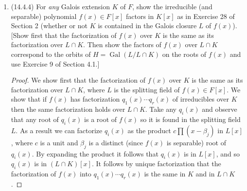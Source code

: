 \documentclass[11pt]{article}
\DeclareMathOperator{\Gal}{Gal}
\begin{document}
\begin{enumerate}
\begin{proof}
        Then apply Exercise 9 of Section 4.1 to see that $G$ permutes the orbits of $H$ transitively and each orbit has the same cardinality. In particular with $\alpha\in \mathcal{O}_1$ we have $\abs{\mathcal{O}_1} = \abs{H\colon H\cap G_\alpha}$, where $G_\alpha\leq G$ is the stabilizer of $\alpha$ in $G$, and $r = \abs{G\colon HG_a}$.

        Observe that the fixed field of $G_\alpha$ is $F(\alpha)$: every element of $F(\alpha)$ is fixed by $G_\alpha$ since $\alpha$ is fixed by $G_\alpha$, and since $L$ is the field $F$ adjoined with every root of $f(x)$, any element of $L$ fixed by $G_\alpha$ is a rational function of only $\alpha$ over $F$. Use the Galois correspondence to see that $\abs{\mathcal{O}_1} = \abs{H\colon H\cap G_\alpha} = [KF(\alpha)\colon K] = [K(\alpha)\colon K]$ ($F\subseteq K$) and the number of orbits $r$ is equal to $\abs{G\colon HG_\alpha} = [K\cap F(\alpha)\colon F]$. Thus $f(x)$ splits into the product of $[K\cap F(\alpha)\colon F]$ many irreducible monic factors times a unit, where each factor has degree $[K(\alpha)\colon K]$.
    \end{proof}
    \item (14.4.4) For \textit{any} Galois extension $K$ of $F$, show the irreducible (and separable) polynomial $f(x)\in F[x]$ factors in $K[x]$ as in Exercise 28 of Section 2 (whether or not $K$ is contained in the Galois closure $L$ of $f(x)$). [Show first that the factorization of $f(x)$ over $K$ is the same as its factorization over $L\cap K$. Then show the factors of $f(x)$ over $L\cap K$ correspond to the orbits of $H = \Gal(L/L\cap K)$ on the roots of $f(x)$ and use Exercise 9 of Section 4.1.] \begin{proof}
       We show first that the factorization of $f(x)$ over $K$ is the same as its factorization over $L\cap K$, where $L$ is the splitting field of $f(x)\in F[x]$. We show that if $f(x)$ has factorization $q_1(x)\cdots q_r(x)$ of irreducibles over $K$ then the same factorization holds over $L\cap K$. Take any $q_i(x)$ and observe that any root of $q_i(x)$ is a root of $f(x)$ so it is found in the splitting field $L$. As a result we can factorize $q_i(x)$ as the product $c\prod(x-\beta_j)$ in $L[x]$, where $c$ is a unit and $\beta_j$ is a distinct (since $f(x)$ is separable) root of $q_i(x)$. By expanding the product it follows that $q_i(x)$ is in $L[x]$, and so $q_i(x)$ is in $(L\cap K)[x]$. It follows by unique factorization that the factorization of $f(x)$ into $q_1(x)\cdots q_r(x)$ is the same in $K$ and in $L\cap K$.


\end{proof}
\end{enumerate}
\end{document}
